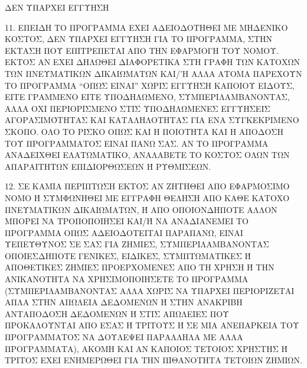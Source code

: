 \begin{small}
ΔΕΝ ΥΠΑΡΧΕΙ ΕΓΓΥΗΣΗ

11. ΕΠΕΙΔΗ ΤΟ ΠΡΟΓΡΑΜΜΑ ΕΧΕΙ ΑΔΕΙΟΔΟΤΗΘΕΙ ΜΕ ΜΗΔΕΝΙΚΟ ΚΟΣΤΟΣ, ΔΕΝ ΥΠΑΡΧΕΙ ΕΓΓΥΗΣΗ ΓΙΑ ΤΟ ΠΡΟΓΡΑΜΜΑ, ΣΤΗΝ ΕΚΤΑΣΗ ΠΟΥ ΕΠΙΤΡΕΠΕΤΑΙ ΑΠΟ ΤΗΝ ΕΦΑΡΜΟΓΗ ΤΟΥ ΝΟΜΟΥ. ΕΚΤΟΣ ΑΝ ΕΧΕΙ ΔΗΛΩΘΕΙ ΔΙΑΦΟΡΕΤΙΚΑ ΣΤΗ ΓΡΑΦΗ ΤΩΝ ΚΑΤΟΧΩΝ ΤΩΝ ΠΝΕΥΜΑΤΙΚΩΝ ΔΙΚΑΙΩΜΑΤΩΝ ΚΑΙ/'Η ΑΛΛΑ ΑΤΟΜΑ ΠΑΡΕΧΟΥΝ ΤΟ ΠΡΟΓΡΑΜΜΑ “ΟΠΩΣ ΕΙΝΑΙ” ΧΩΡΙΣ ΕΓΓΥΗΣΗ ΚΑΠΟΙΟΥ ΕΙΔΟΥΣ, ΕΙΤΕ ΓΡΑΜΜΕΝΟ ΕΙΤΕ ΥΠΟΔΗΛΩΜΕΝΟ,  ΣΥΜΠΕΡΙΛΑΜΒΑΝΟΝΤΑΣ, ΑΛΛΑ ΟΧΙ ΠΕΡΙΟΡΙΣΜΕΝΟ ΣΤΙΣ ΥΠΟΔΗΛΩΜΕΝΕΣ ΕΓΓΥΗΣΕΙΣ ΑΓΟΡΑΣΙΜΌΤΗΤΑΣ ΚΑΙ ΚΑΤΑΛΗΛΟΤΗΤΑΣ ΓΙΑ ΕΝΑ ΣΥΓΚΕΚΡΙΜΕΝΟ ΣΚΟΠΟ. ΟΛΟ ΤΟ ΡΙΣΚΟ ΟΠΩΣ ΚΑΙ Η ΠΟΙΟΤΗΤΑ ΚΑΙ Η ΑΠΟΔΟΣΗ ΤΟΥ ΠΡΟΓΡΑΜΜΑΤΟΣ ΕΙΝΑΙ ΠΑΝΩ ΣΑΣ. ΑΝ ΤΟ ΠΡΟΓΡΑΜΜΑ ΑΝΑΔΕΙΧΘΕΙ ΕΛΑΤΩΜΑΤΙΚΟ, ΑΝΑΛΑΒΕΤΕ ΤΟ ΚΟΣΤΟΣ ΟΛΩΝ ΤΩΝ ΑΠΑΡΑΙΤΗΤΩΝ ΕΠΙΔΙΟΡΘΩΣΕΩΝ Ή ΡΥΘΜΙΣΕΩΝ.

12. ΣΕ ΚΑΜΙΑ ΠΕΡΙΠΤΩΣΗ ΕΚΤΟΣ ΑΝ ΖΗΤΗΘΕΙ ΑΠΟ ΕΦΑΡΜΟΣΙΜΟ ΝΟΜΟ Ή ΣΥΜΦΩΝΗΘΕΙ ΜΕ ΕΓΓΡΑΦΗ ΘΕΛΗΣΗ ΑΠΟ ΚΑΘΕ ΚΑΤΟΧΟ ΠΝΕΥΜΑΤΙΚΩΝ ΔΙΚΑΙΩΜΑΤΩΝ, Ή ΑΠΟ ΟΠΟΙΟΝΔΗΠΟΤΕ ΑΛΛΟΝ ΜΠΟΡΕΙ ΝΑ ΤΡΟΠΟΠΟΙΗΣΕΙ ΚΑΙ/Ή ΝΑ ΑΝΑΔΙΑΝΕΜΕΙ ΤΟ ΠΡΟΓΡΑΜΜΑ ΟΠΩΣ ΑΔΕΙΟΔΟΤΕΙΤΑΙ ΠΑΡΑΠΑΝΩ, ΕΙΝΑΙ ΥΕΠΕΥΘΥΝΟΣ ΣΕ ΣΑΣ ΓΙΑ ΖΗΜΙΕΣ, ΣΥΜΠΕΡΙΛΑΜΒΑΝΟΝΤΑΣ ΟΠΟΙΕΣΔΗΠΟΤΕ ΓΕΝΙΚΕΣ, ΕΙΔΙΚΕΣ, ΣΥΜΠΤΩΜΑΤΙΚΕΣ Ή ΑΠΟΘΕΤΙΚΕΣ ΖΗΜΙΕΣ ΠΡΟΕΡΧΟΜΕΝΕΣ ΑΠΟ ΤΗ ΧΡΗΣΗ Ή ΤΗΝ ΑΝΙΚΑΝΟΤΗΤΑ ΝΑ ΧΡΗΣΙΜΟΠΟΙΗΣΕΤΕ ΤΟ ΠΡΟΓΡΑΜΜΑ (ΣΥΜΠΕΡΙΛΑΜΒΑΝΟΝΤΑΣ ΑΛΛΑ ΧΩΡΙΣ ΝΑ ΥΠΑΡΧΕΙ ΠΕΡΙΟΡΙΖΕΤΑΙ ΑΠΛΑ ΣΤΗΝ ΑΠΩΛΕΙΑ ΔΕΔΟΜΕΝΩΝ Ή ΣΤΗΝ ΑΝΑΚΡΙΒΗ ΑΝΤΑΠΟΔΟΣΗ ΔΕΔΟΜΕΝΩΝ Ή ΣΤΙΣ ΑΠΩΛΕΙΕΣ ΠΟΥ ΠΡΟΚΑΛΟΥΝΤΑΙ ΑΠΟ ΕΣΑΣ Ή ΤΡΙΤΟΥΣ Ή ΣΕ ΜΙΑ ΑΝΕΠΑΡΚΕΙΑ ΤΟΥ ΠΡΟΓΡΑΜΜΑΤΟΣ ΝΑ ΔΟΥΛΕΨΕΙ ΠΑΡΑΛΛΗΛΑ ΜΕ ΑΛΛΑ ΠΡΟΓΡΑΜΜΑΤΑ), ΑΚΟΜΗ ΚΑΙ ΑΝ ΚΑΠΟΙΟΣ ΤΕΤΟΙΟΣ ΧΡΗΣΤΗΣ Ή ΤΡΙΤΟΣ ΕΧΕΙ ΕΝΗΜΕΡΩΘΕΙ ΓΙΑ ΤΗΝ ΠΙΘΑΝΟΤΗΤΑ ΤΕΤΟΙΩΝ ΖΗΜΙΩΝ. 
\end{small}
